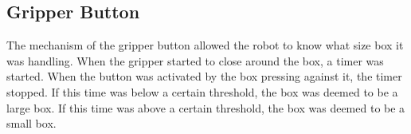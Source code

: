 \documentclass[11pt]{report}
\begin{document}
\subsection{Gripper Button}
The mechanism of the gripper button allowed the robot to know what size box it was handling. When the gripper started to close around the box, a timer was started. When the button was activated by the box pressing against it, the timer stopped. If this time was below a certain threshold, the box was deemed to be a large box. If this time was above a certain threshold, the box was deemed to be a small box. 
\end{document}
